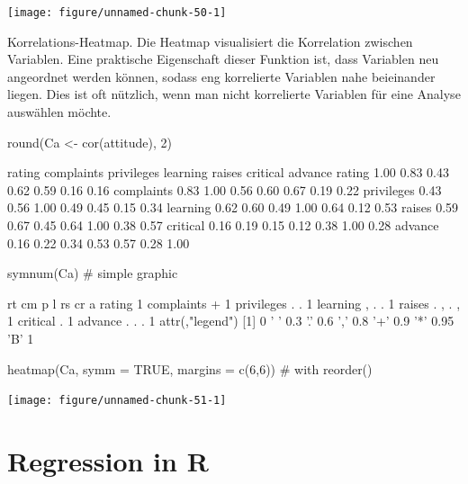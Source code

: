 \documentclass[a4paper,twoside]{tufte-book}\usepackage[]{graphicx}\usepackage[]{color}
\begin{document}
\begin{appendices}
\begin{Schunk}
{\centering \texttt{[image: figure/unnamed-chunk-50-1]} 

}

\end{Schunk}



Korrelations-Heatmap. Die Heatmap visualisiert die Korrelation zwischen Variablen. Eine praktische Eigenschaft dieser Funktion ist, dass Variablen neu angeordnet werden können, sodass eng korrelierte Variablen nahe beieinander liegen. Dies ist oft nützlich, wenn man nicht korrelierte Variablen für eine Analyse auswählen möchte.

\begin{Schunk}
\begin{Sinput}
round(Ca <- cor(attitude), 2)
\end{Sinput}
\begin{Soutput}
           rating complaints privileges learning raises critical advance
rating       1.00       0.83       0.43     0.62   0.59     0.16    0.16
complaints   0.83       1.00       0.56     0.60   0.67     0.19    0.22
privileges   0.43       0.56       1.00     0.49   0.45     0.15    0.34
learning     0.62       0.60       0.49     1.00   0.64     0.12    0.53
raises       0.59       0.67       0.45     0.64   1.00     0.38    0.57
critical     0.16       0.19       0.15     0.12   0.38     1.00    0.28
advance      0.16       0.22       0.34     0.53   0.57     0.28    1.00
\end{Soutput}
\begin{Sinput}
symnum(Ca) # simple graphic
\end{Sinput}
\begin{Soutput}
           rt cm p l rs cr a
rating     1                
complaints +  1             
privileges .  .  1          
learning   ,  .  . 1        
raises     .  ,  . , 1      
critical             .  1   
advance          . . .     1
attr(,"legend")
[1] 0 ' ' 0.3 '.' 0.6 ',' 0.8 '+' 0.9 '*' 0.95 'B' 1
\end{Soutput}
\begin{Sinput}
heatmap(Ca, symm = TRUE, margins = c(6,6)) # with reorder()
\end{Sinput}


{\centering \texttt{[image: figure/unnamed-chunk-51-1]} 

}

\end{Schunk}

\chapter{Regression in R}



\end{appendices}
\end{document}
